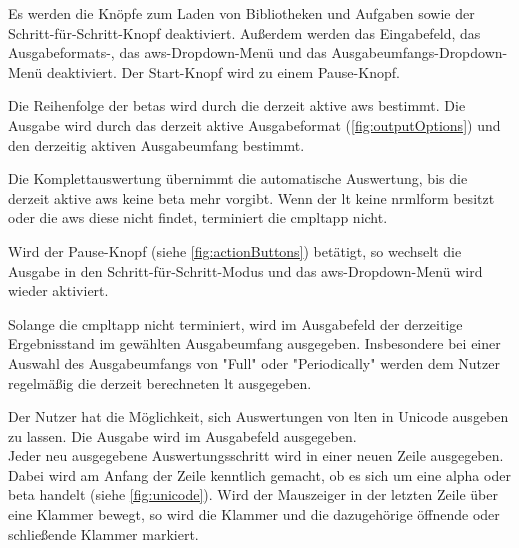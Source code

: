 \documentclass[parskip=full,11pt,twoside]{scrartcl}
\begin{document}
Es werden die Knöpfe zum Laden von Bibliotheken und Aufgaben sowie der Schritt-für-Schritt-Knopf deaktiviert.
Außerdem werden das Eingabefeld, das Ausgabeformats-, das \gls{aws}-Dropdown-Menü und das Ausgabeumfangs-Dropdown-Menü deaktiviert.
Der Start-Knopf wird zu einem Pause-Knopf.

Die Reihenfolge der \glspl{beta} wird durch die derzeit aktive \gls{aws} bestimmt. Die Ausgabe wird durch das derzeit aktive Ausgabeformat (\cref{fig:outputOptions}) und den derzeitig aktiven Ausgabeumfang bestimmt.

Die Komplettauswertung übernimmt die automatische Auswertung, bis die derzeit aktive \gls{aws} keine \gls{beta} mehr vorgibt.
Wenn der \gls{lt} keine \gls{nrmlform} besitzt oder die \gls{aws} diese nicht findet, terminiert die \gls{cmpltapp} nicht.

Wird der Pause-Knopf (siehe \cref{fig:actionButtons}) betätigt, so wechselt die Ausgabe in den Schritt-für-Schritt-Modus und das \gls{aws}-Dropdown-Menü wird wieder aktiviert.

Solange die \gls{cmpltapp} nicht terminiert, wird im Ausgabefeld der derzeitige Ergebnisstand im gewählten Ausgabeumfang ausgegeben. 
Insbesondere bei einer Auswahl des Ausgabeumfangs von "Full" oder "Periodically" werden dem Nutzer regelmäßig die derzeit berechneten \gls{lt} ausgegeben.

Der Nutzer hat die Möglichkeit, sich Auswertungen von \gls{lt}en in Unicode ausgeben zu lassen. Die Ausgabe wird im Ausgabefeld ausgegeben.\\
Jeder neu ausgegebene Auswertungsschritt wird in einer neuen Zeile ausgegeben. 
Dabei wird am Anfang der Zeile kenntlich gemacht, ob es sich um eine \gls{alpha} oder \gls{beta} handelt (siehe \cref{fig:unicode}).
Wird der Mauszeiger in der letzten Zeile über eine Klammer bewegt, so wird die Klammer und die dazugehörige öffnende oder schließende Klammer markiert.
\end{document}
